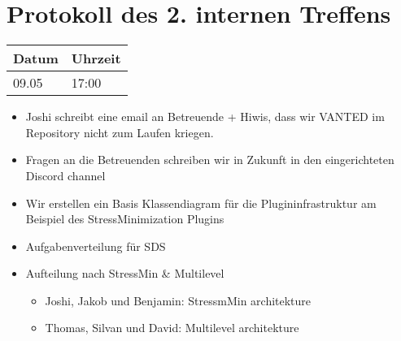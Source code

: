 \documentclass[]{article}
\date{}
\providecommand{\tightlist}{%
  \setlength{\itemsep}{0pt}\setlength{\parskip}{0pt}}
\begin{document}
\section{Protokoll des 2. internen
Treffens}\label{protokoll-des-2.-internen-treffens}

\begin{center}
\begin{tabular}[]{|l|l|}
\hline
Datum & Uhrzeit \\
\hline
09.05 & 17:00 \\
\hline
\end{tabular}
\end{center}

\begin{itemize}
\item
  Joshi schreibt eine email an Betreuende + Hiwis, dass wir VANTED im
  Repository nicht zum Laufen kriegen.
\item
  Fragen an die Betreuenden schreiben wir in Zukunft in den
  eingerichteten Discord channel
\item
  Wir erstellen ein Basis Klassendiagram für die Plugininfrastruktur am
  Beispiel des StressMinimization Plugins
\item
  Aufgabenverteilung für SDS
\item
  Aufteilung nach StressMin \& Multilevel

  \begin{itemize}
  \tightlist
  \item
    Joshi, Jakob und Benjamin: StressmMin architekture
  \item
    Thomas, Silvan und David: Multilevel architekture
  \end{itemize}
\end{itemize}
\end{document}
